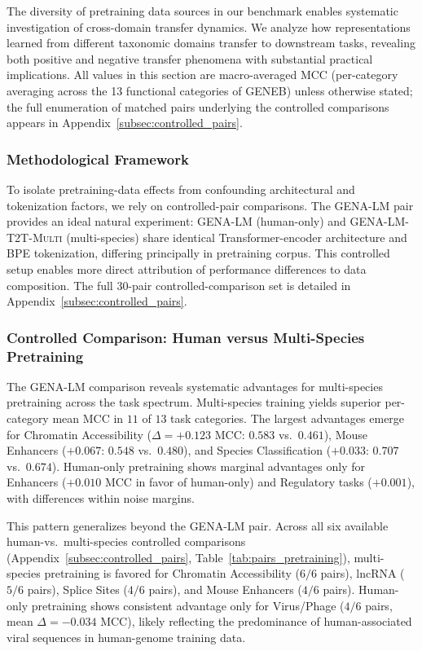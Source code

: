 \documentclass{llmxive}
\begin{document}
The diversity of pretraining data sources in our benchmark enables
systematic investigation of cross-domain transfer dynamics. We
analyze how representations learned from different taxonomic
domains transfer to downstream tasks, revealing both positive and
negative transfer phenomena with substantial practical
implications. All values in this section are macro-averaged MCC
(per-category averaging across the 13 functional categories of
GENEB) unless otherwise stated; the full enumeration of matched
pairs underlying the controlled comparisons appears in
Appendix~\ref{subsec:controlled_pairs}.

\subsubsection{Methodological Framework}

To isolate pretraining-data effects from confounding architectural
and tokenization factors, we rely on controlled-pair comparisons.
The \textsc{GENA-LM} pair provides an ideal natural experiment:
\textsc{GENA-LM} (human-only) and \textsc{GENA-LM-T2T-Multi}
(multi-species) share identical Transformer-encoder architecture
and BPE tokenization, differing principally in pretraining corpus.
This controlled setup enables more direct attribution of performance
differences to data composition. The full 30-pair controlled-comparison
set is detailed in Appendix~\ref{subsec:controlled_pairs}.

\subsubsection{Controlled Comparison: Human versus Multi-Species Pretraining}

The \textsc{GENA-LM} comparison reveals systematic advantages for
multi-species pretraining across the task spectrum. Multi-species
training yields superior per-category mean MCC in $11$ of $13$
task categories. The largest advantages emerge for Chromatin
Accessibility ($\Delta = +0.123$ MCC: $0.583$ vs.\ $0.461$),
Mouse Enhancers ($+0.067$: $0.548$ vs.\ $0.480$), and Species
Classification ($+0.033$: $0.707$ vs.\ $0.674$). Human-only
pretraining shows marginal advantages only for Enhancers
($+0.010$ MCC in favor of human-only) and Regulatory tasks
($+0.001$), with differences within noise margins.

This pattern generalizes beyond the \textsc{GENA-LM} pair. Across
all six available human-vs.\ multi-species controlled comparisons
(Appendix~\ref{subsec:controlled_pairs},
Table~\ref{tab:pairs_pretraining}), multi-species pretraining is
favored for Chromatin Accessibility ($6/6$ pairs), lncRNA
($5/6$ pairs), Splice Sites ($4/6$ pairs), and Mouse Enhancers
($4/6$ pairs). Human-only pretraining shows consistent advantage
only for Virus/Phage ($4/6$ pairs, mean $\Delta = -0.034$ MCC),
likely reflecting the predominance of human-associated viral
sequences in human-genome training data.
\end{document}
